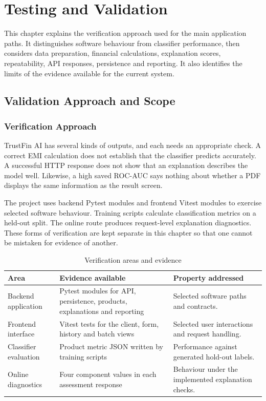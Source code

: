 \chapter[TESTING AND VALIDATION]{Testing and Validation}

This chapter explains the verification approach used for the main application paths. It distinguishes software behaviour from classifier performance, then considers data preparation, financial calculations, explanation scores, repeatability, API responses, persistence and reporting. It also identifies the limits of the evidence available for the current system.

\section{Validation Approach and Scope}
\subsection{Verification Approach}
TrustFin AI has several kinds of outputs, and each needs an appropriate check. A correct EMI calculation does not establish that the classifier predicts accurately. A successful HTTP response does not show that an explanation describes the model well. Likewise, a high saved ROC-AUC says nothing about whether a PDF displays the same information as the result screen.

The project uses backend Pytest modules and frontend Vitest modules to exercise selected software behaviour. Training scripts calculate classification metrics on a held-out split. The online route produces request-level explanation diagnostics. These forms of verification are kept separate in this chapter so that one cannot be mistaken for evidence of another.

\begin{table}[htbp]\centering\small
\caption{Verification areas and evidence}\label{tab:testing-summary}
\begin{tabularx}{\textwidth}{p{3.4cm}XX}\toprule
Area & Evidence available & Property addressed\\\midrule
Backend application & Pytest modules for API, persistence, products, explanations and reporting & Selected software paths and contracts.\\
Frontend interface & Vitest tests for the client, form, history and batch views & Selected user interactions and request handling.\\
Classifier evaluation & Product metric JSON written by training scripts & Performance against generated hold-out labels.\\
Online diagnostics & Four component values in each assessment response & Behaviour under the implemented explanation checks.\\\bottomrule
\end{tabularx}\end{table}

